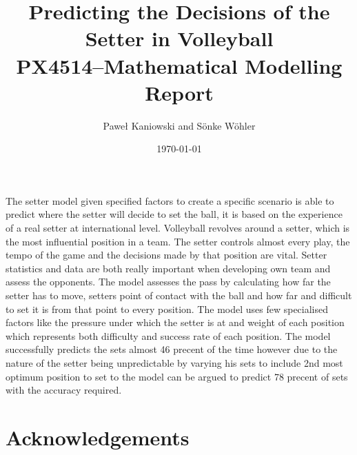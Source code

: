 \documentclass[11pt]{article}
\title{   Predicting the Decisions of the Setter in Volleyball \\
  \large PX4514--Mathematical Modelling Report
}
\author{Pawe{\l} Kaniowski and S\"onke W\"ohler}
\date{\today}
\begin{document}
  
  

  \clearpage
  
  \abstract
    \begingroup
      \fontsize{8pt}{10pt}\selectfont
    
        The setter model given specified factors to create a specific scenario is able to predict where the setter will decide to set the ball, it is based on the experience of a real setter at international level. Volleyball revolves around a setter, which is the most influential position in a team. The setter controls almost every play, the tempo of the game and the decisions made by that position are vital. Setter statistics and data are both really important when developing own team and assess the opponents. The model assesses the pass by calculating how far the setter has to move, setters point of contact with the ball and how far and difficult to set it is from that point to every position. The model uses few specialised factors like the pressure under which the setter is at and weight of each position which represents both difficulty and success rate of each position. The model successfully predicts the sets almost 46 precent of the time however due to the nature of the setter being unpredictable by varying his sets to include 2nd most optimum position to set to the model can be argued to predict 78 precent of sets with the accuracy required.
    
    \endgroup
    \hrulefill
    
      
      
      
      
    
    \clearpage
    \section*{Acknowledgements}
    \nocite{*} %
    
  
\end{document}

